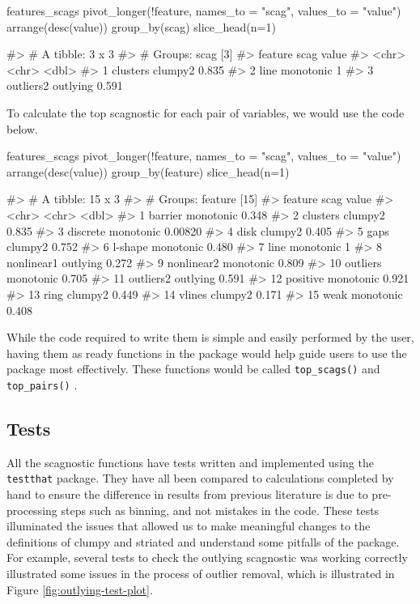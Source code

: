 \begin{Schunk}
\begin{Sinput}
features_scags %
  pivot_longer(!feature, names_to = "scag", values_to = "value") %
  arrange(desc(value)) %
  group_by(scag) %
  slice_head(n=1)
\end{Sinput}
\begin{Soutput}
#> # A tibble: 3 x 3
#> # Groups:   scag [3]
#>   feature   scag      value
#>   <chr>     <chr>     <dbl>
#> 1 clusters  clumpy2   0.835
#> 2 line      monotonic 1    
#> 3 outliers2 outlying  0.591
\end{Soutput}
\end{Schunk}

To calculate the top scagnostic for each pair of variables, we would use
the code below.

\begin{Schunk}
\begin{Sinput}
features_scags %
  pivot_longer(!feature, names_to = "scag", values_to = "value") %
  arrange(desc(value)) %
  group_by(feature) %
  slice_head(n=1)
\end{Sinput}
\begin{Soutput}
#> # A tibble: 15 x 3
#> # Groups:   feature [15]
#>    feature    scag        value
#>    <chr>      <chr>       <dbl>
#>  1 barrier    monotonic 0.348  
#>  2 clusters   clumpy2   0.835  
#>  3 discrete   monotonic 0.00820
#>  4 disk       clumpy2   0.405  
#>  5 gaps       clumpy2   0.752  
#>  6 l-shape    monotonic 0.480  
#>  7 line       monotonic 1      
#>  8 nonlinear1 outlying  0.272  
#>  9 nonlinear2 monotonic 0.809  
#> 10 outliers   monotonic 0.705  
#> 11 outliers2  outlying  0.591  
#> 12 positive   monotonic 0.921  
#> 13 ring       clumpy2   0.449  
#> 14 vlines     clumpy2   0.171  
#> 15 weak       monotonic 0.408
\end{Soutput}
\end{Schunk}

While the code required to write them is simple and easily performed by
the user, having them as ready functions in the package would help guide
users to use the package most effectively. These functions would be
called \texttt{top\_scags()} and \texttt{top\_pairs()} .

\hypertarget{tests}{%
\subsection{Tests}\label{tests}}

All the scagnostic functions have tests written and implemented using
the \texttt{testthat} package. They have all been compared to
calculations completed by hand to ensure the difference in results from
previous literature is due to pre-processing steps such as binning, and
not mistakes in the code. These tests illuminated the issues that
allowed us to make meaningful changes to the definitions of clumpy and
striated and understand some pitfalls of the package. For example,
several tests to check the outlying scagnostic was working correctly
illustrated some issues in the process of outlier removal, which is
illustrated in Figure \ref{fig:outlying-test-plot}.

